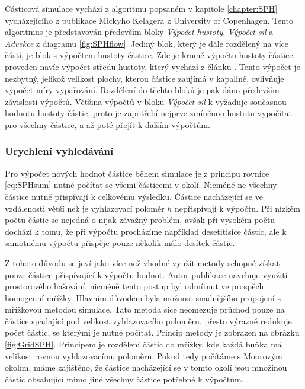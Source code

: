 Částicová simulace vychází z algoritmu popsaném v kapitole \ref{chapter:SPH} vycházejícího z publikace \cite{KelagerSPH} Mickyho Kelagera z University of Copenhagen. Tento algoritmus je představován především bloky \textit{Výpočet hustoty}, \textit{Výpočet sil} a \textit{Advekce} z diagramu \ref{fig:SPHflow}. Jediný blok, který je dále rozdělený na více částí, je blok s výpočtem hustoty částice. Zde je kromě výpočtu hustoty částice proveden navíc výpočet středu hustoty, který vychází z článku \cite{sufaceSPH}. Tento výpočet je nezbytný, jelikož velikost plochy, kterou částice zaujímá v kapalině, ovlivňuje výpočet míry vypařování. Rozdělení do těchto bloků je pak dáno především závislostí výpočtů. Většina výpočtů v bloku \textit{Výpočet sil} k vyžaduje současnou hodnotu hustoty částic, proto je zapotřebí nejprve zmíněnou hustotu vypočítat pro všechny částice, a až poté přejít k dalším výpočtům.

\subsubsection{Urychlení vyhledávání}
Pro výpočet nových hodnot částice během simulace je z principu rovnice \ref{eq:SPHsum} nutné počítat se všemi částicemi v okolí. Nicméně ne všechny částice nutně přispívají k celkovému výsledku. Částice nacházející se ve vzdálenosti větší než je vyhlazovací poloměr $h$ nepřispívají k výpočtu. Při nízkém počtu částic se nejedná o nijak závažný problém, avšak při vysokém počtu dochází k tomu, že při výpočtu procházíme například desetitisíce částic, ale k samotnému výpočtu přispěje pouze několik málo desítek částic. 

Z tohoto důvodu se jeví jako více než vhodné využít metody schopné získat pouze částice přispívající k výpočtu hodnot. Autor publikace \cite{KelagerSPH} navrhuje využití prostorového hašování, nicméně tento postup byl odmítnut ve prospěch homogenní mřížky. Hlavním důvodem byla možnost snadnějšího propojení s mřížkovou metodou simulace. Tato metoda sice neomezuje průchod pouze na částice spadající pod velikost vyhlazovacího poloměru, přesto výrazně redukuje počet částic, se kterými je nutné počítat. Princip metody je zobrazen na obrázku \ref{fig:GridSPH}. Principem je rozdělení částic do mřížky, kde každá buňka má velikost rovnou vyhlazovacímu poloměru. Pokud tedy počítáme s Moorovým okolím, máme zajištěno, že částice nacházející se v tomto okolí jsou množinou částic obsahující mimo jiné všechny částice potřebné k výpočtům.

